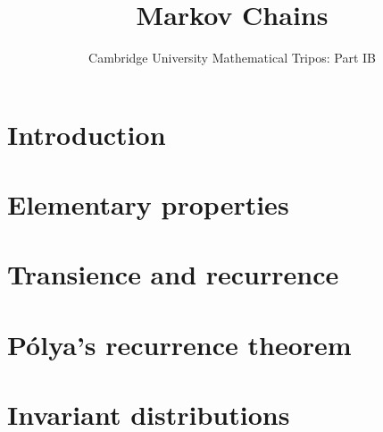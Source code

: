\documentclass{article}
\title{Markov Chains}
\author{Cambridge University Mathematical Tripos: Part IB}
\begin{document}
\maketitle

\tableofcontentsnewpage{}

\section{Introduction}

\section{Elementary properties}

\section{Transience and recurrence}

\section{P\'olya's recurrence theorem}

\section{Invariant distributions}

\end{document}
